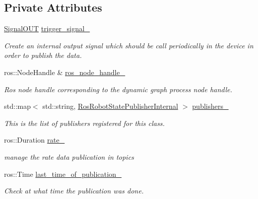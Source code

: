 \subsection*{Private Attributes}
\begin{DoxyCompactItemize}
\item 
\hyperlink{namespacedynamic__graph_a9d80c350c95e161319d7a6e629ecdc4b}{Signal\+O\+UT} \hyperlink{classdynamic__graph_1_1RosRobotStatePublisher_a175914c0624474d019cb1360fa9c14e4}{trigger\+\_\+signal\+\_\+}
\begin{DoxyCompactList}\small\item\em Create an internal output signal which should be call periodically in the device in order to publish the data. \end{DoxyCompactList}\item 
\mbox{\label{classdynamic__graph_1_1RosRobotStatePublisher_a5b494e473d93118cb69320c01dfd772c}} 
ros\+::\+Node\+Handle \& \hyperlink{classdynamic__graph_1_1RosRobotStatePublisher_a5b494e473d93118cb69320c01dfd772c}{ros\+\_\+node\+\_\+handle\+\_\+}
\begin{DoxyCompactList}\small\item\em Ros node handle corresponding to the dynamic graph process node handle. \end{DoxyCompactList}\item 
std\+::map$<$ std\+::string, \hyperlink{structdynamic__graph_1_1RosRobotStatePublisherInternal}{Ros\+Robot\+State\+Publisher\+Internal} $>$ \hyperlink{classdynamic__graph_1_1RosRobotStatePublisher_a556fe3ed8d7c0786e0d6aad4cbb415db}{publishers\+\_\+}
\begin{DoxyCompactList}\small\item\em This is the list of publishers registered for this class. \end{DoxyCompactList}\item 
\mbox{\label{classdynamic__graph_1_1RosRobotStatePublisher_af638eb336998964161a89e4ce76821d1}} 
ros\+::\+Duration \hyperlink{classdynamic__graph_1_1RosRobotStatePublisher_af638eb336998964161a89e4ce76821d1}{rate\+\_\+}
\begin{DoxyCompactList}\small\item\em manage the rate data publication in topics \end{DoxyCompactList}\item 
\mbox{\label{classdynamic__graph_1_1RosRobotStatePublisher_a000e917f448ac480bfc8b2559d41a4b5}} 
ros\+::\+Time \hyperlink{classdynamic__graph_1_1RosRobotStatePublisher_a000e917f448ac480bfc8b2559d41a4b5}{last\+\_\+time\+\_\+of\+\_\+publication\+\_\+}
\begin{DoxyCompactList}\small\item\em Check at what time the publication was done. \end{DoxyCompactList}\end{DoxyCompactItemize}
